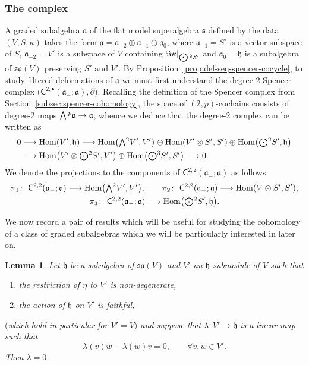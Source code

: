 \documentclass[pdftex]{sigma}
\numberwithin{equation}{section}
\newtheorem{Lemma}[Theorem]{Lemma}
\newcommand{\fa}{\mathfrak{a}}
\newcommand{\fh}{\mathfrak{h}}
\newcommand{\fs}{\mathfrak{s}}
\newcommand{\fso}{\mathfrak{so}}
\newcommand{\ssC}{\mathsf{C}}
\newcommand{\Wedge}{\mathchoice{{\textstyle\bigwedge}}{\bigwedge}{\bigwedge}{\bigwedge}}	%
\newcommand{\Odot}{\mathchoice{{\textstyle\bigodot}}{\bigodot}{\bigodot}{\bigodot}}
\newcommand{\1}{\mathbbm{1}}
\DeclareMathOperator{\Hom}{Hom}
\begin{document}
\subsubsection{The complex}

A graded subalgebra $\fa$ of the flat model superalgebra $\fs$ defined by the data $(V,S,\kappa)$ takes the form $\fa=\fa_{-2}\oplus\fa_{-1}\oplus\fa_0$, where $\fa_{-1}=S'$ is a vector subspace of $S$, $\fa_{-2}=V'$ is a subspace of $V$ containing $\Im \kappa|_{\Odot^2S'}$ and $\fa_0=\fh$ is a subalgebra of $\fso(V)$ preserving $S'$ and $V'$. By Proposition~\ref{prop:def-seq-spencer-cocycle}, to study filtered deformations of $\fa$ we must first understand the degree-2 Spencer complex $\bigl(\ssC^{2,\bullet}(\fa_-;\fa),\partial\bigr)$. Recalling the definition of the Spencer complex from Section~\ref{subsec:spencer-cohomology}, the space of $(2,p)$-cochains consists of degree-2 maps $\Wedge^p\fa\to\fa$, whence we deduce that the degree-2 complex can be written as
\begin{align*}
	0 &\longrightarrow \Hom(V',\fh)
\longrightarrow \Hom\bigl(\Wedge^2V',V'\bigr)\oplus\Hom(V'\otimes S',S')\oplus\Hom\bigl(\Odot^2S',\fh\bigr)\\
	&\longrightarrow \Hom\bigl(V'\otimes\Odot^2S',V'\bigr)\oplus\Hom\bigl(\Odot^3S',S'\bigr)\longrightarrow 0.
\end{align*}
We denote the projections to the components of $\ssC^{2,2}(\fa_-;\fa)$ as follows
\begin{gather*}
	\pi_1\colon\ \ssC^{2,2}(\fa_-;\fa) \longrightarrow \Hom\bigl(\Wedge^2V',V'\bigr),\qquad
	\pi_2\colon\ \ssC^{2,2}(\fa_-;\fa) \longrightarrow \Hom(V\otimes S',S'),\\
	\pi_3\colon\ \ssC^{2,2}(\fa_-;\fa) \longrightarrow \Hom\bigl(\Odot^2S',\fh\bigr).
\end{gather*}

We now record a pair of results which will be useful for studying the cohomology of a class of graded subalgebras which we will be particularly interested in later on.

\begin{Lemma}\label{lemma:V-h-maps}
	Let $\fh$ be a subalgebra of $\fso(V)$ and $V'$ an $\fh$-submodule of $V$ such that
	\begin{enumerate}\itemsep=0pt
		\item[$(1)$] the restriction of $\eta$ to $V'$ is non-degenerate,
		\item[$(2)$] the action of $\fh$ on $V'$ is faithful,
	\end{enumerate}
	$($which hold in particular for $V'=V)$ and suppose that $\lambda\colon V'\to\fh$ is a linear map such that
	\[%
		\lambda(v)w - \lambda(w)v = 0, \qquad \forall v,w\in V'.
	\]
	Then $\lambda=0$.
\end{Lemma}
\end{document}
